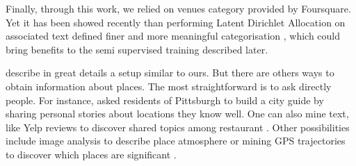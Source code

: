 Finally, through this work, we relied on venues category provided by
Foursquare. Yet it has been showed recently than performing Latent Dirichlet
Allocation on associated text defined finer and more meaningful categorisation
\autocite{PlaceSemantic14}, which could bring benefits to the semi supervised
training described later.

\bigskip

\Textcite{TwitterMongoDB13} describe in great details a setup similar to ours.
But there are others ways to obtain information about places. The most
straightforward is to ask directly people. For instance, \textcite{Curated14}
asked residents of Pittsburgh to build a city guide by sharing personal stories
about locations they know well. One can also mine text, like Yelp reviews to
discover shared topics among restaurant \autocite{YelpReview14}.  Other
possibilities include image analysis to describe place atmosphere or mining GPS
trajectories to discover which places are significant \autocite{GPSStay10}.
